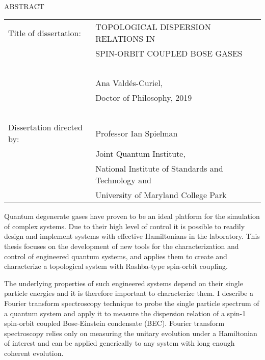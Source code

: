 
\hbox{\ }

\renewcommand{\baselinestretch}{1}
\small \normalsize

\begin{center}
\large{{ABSTRACT}} 

\vspace{3em} 

\end{center}
\hspace{-.15in}
\begin{tabular}{ll}
Title of dissertation:   
&				      {\large  TOPOLOGICAL DISPERSION RELATIONS IN } \\
&				      {\large  SPIN-ORBIT COUPLED BOSE GASES} \\
\ \\
&                     {\large  Ana Valdés-Curiel,} \\
&					  {\large  Doctor of Philosophy, 2019} \\
\ \\
Dissertation directed by: & {\large  Professor Ian Spielman} \\
&  							{\small	 Joint Quantum Institute,} \\
&  							{\small	 National Institute of Standards and Technology and} \\
&  							{\small	 University of Maryland College Park} \\
\end{tabular}

\vspace{3em}

\renewcommand{\baselinestretch}{2}
\large \normalsize

Quantum degenerate gases have proven to be an ideal platform for the  simulation of complex systems. Due to their high level of control it is possible to readily design and implement systems with effective Hamiltonians in the laboratory. This thesis focuses on the development of new tools for the characterization and control of engineered quantum systems, and applies them to create and characterize a topological system with Rashba-type spin-orbit coupling. 

The underlying properties of such engineered systems depend on their single particle energies and it is therefore important to characterize them. I describe a Fourier transform spectroscopy technique to probe the single particle spectrum of a quantum system and apply it to measure the dispersion relation of a spin-1 spin-orbit coupled Bose-Einstein condensate (BEC). Fourier transform spectroscopy relies only on measuring the unitary evolution under a Hamiltonian of interest and can be applied generically to any system with long enough coherent evolution.

